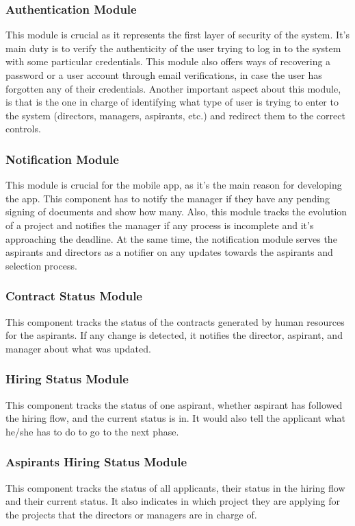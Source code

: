 \documentclass{scrreprt}
\begin{document}
\subsubsection{Authentication Module}
This module is crucial as it represents the first layer of security of the system. It's main duty is to verify the authenticity of the user trying to log in to the system with some particular credentials. This module also offers ways of recovering a password or a user account through email verifications, in case the user has forgotten any of their credentials. Another important aspect about this module, is that is the one in charge of identifying what type of user is trying to enter to the system (directors, managers, aspirants, etc.) and redirect them to the correct controls.
\subsubsection{Notification Module}
This module is crucial for the mobile app, as it's the main reason for developing the app. This component has to notify the manager if they have any pending signing of documents and show how many. Also, this module tracks the evolution of a project and notifies the manager if any process is incomplete and it's approaching the deadline. At the same time, the notification module serves the aspirants and directors as a notifier on any updates towards the aspirants and selection process.
\subsubsection{Contract Status Module}
This component tracks the status of the contracts generated by human resources for the aspirants. If any change is detected, it notifies the director, aspirant, and manager about what was updated.
\subsubsection{Hiring Status Module}
This component tracks the status of one aspirant, whether aspirant has followed the hiring flow, and the current status is in. It would also tell the applicant what he/she has to do to go to the next phase.
\subsubsection{Aspirants Hiring Status Module}
This component tracks the status of all applicants, their status in the hiring flow and their current status. It also indicates in which project they are applying for the projects that the directors or managers are in charge of.
\end{document}
